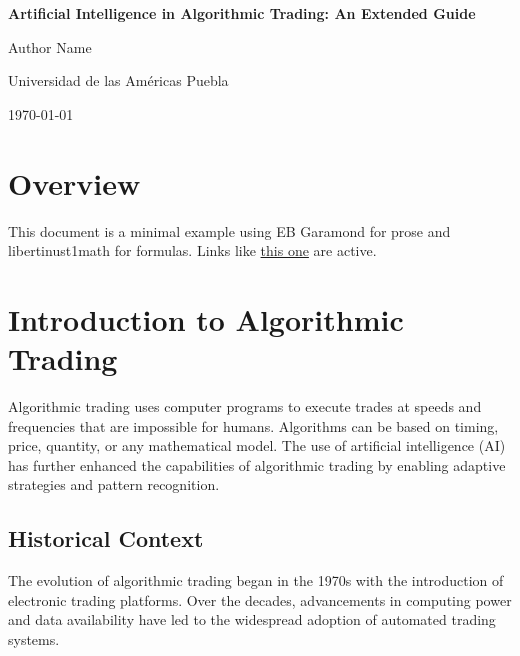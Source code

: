 \documentclass[10pt,a4paper]{article} %
\begin{document}
\begin{titlepage}
  \centering
  \vspace*{4cm}
  {\Huge\bfseries Artificial Intelligence in Algorithmic Trading: An Extended Guide\par}
  \vspace{2cm}
  {\Large Author Name\par}
  \vspace{1cm}
  {\large Universidad de las Américas Puebla\par}
  \vfill
  {\large \today\par}
\end{titlepage}

\begin{abstract}
This document provides a template for reports in the "AI in Financial Services" course, using EB Garamond for prose and Libertinus Math for formulas. It includes a cover page, abstract, table of contents, and sample sections for math and text. Additional content demonstrates tables, code, and references.
\end{abstract}

\tableofcontents
\thispagestyle{empty}
\newpage

\section{Overview}
This document is a minimal example using EB Garamond for prose and libertinust1math for formulas.
Links like \href{https://example.com}{this one} are active.

\section{Introduction to Algorithmic Trading}
Algorithmic trading uses computer programs to execute trades at speeds and frequencies that are impossible for humans. Algorithms can be based on timing, price, quantity, or any mathematical model. The use of artificial intelligence (AI) has further enhanced the capabilities of algorithmic trading by enabling adaptive strategies and pattern recognition.

\subsection{Historical Context}
The evolution of algorithmic trading began in the 1970s with the introduction of electronic trading platforms. Over the decades, advancements in computing power and data availability have led to the widespread adoption of automated trading systems.
\end{document}
